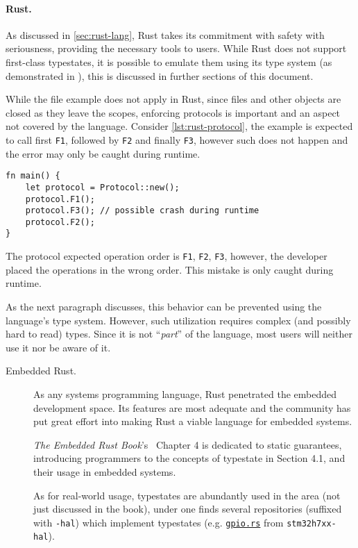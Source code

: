 \paragraph{Rust.}
As discussed in \autoref{sec:rust-lang}, Rust takes its commitment with safety with seriousness,
providing the necessary tools to users.
While Rust does not support first-class typestates,
it is possible to emulate them using its type system (as demonstrated in \autocite{Duarte2020}),
this is discussed in further sections of this document.

While the file example does not apply in Rust, since files and other objects are closed as they leave the scopes,
enforcing protocols is important and an aspect not covered by the language.
Consider \autoref{lst:rust-protocol}, the example is expected to call first \texttt{F1}, followed by \texttt{F2} and finally \texttt{F3},
however such does not happen and the error may only be caught during runtime.

\begin{listing}
    \centering
    \begin{verbatim}
fn main() {
    let protocol = Protocol::new();
    protocol.F1();
    protocol.F3(); // possible crash during runtime
    protocol.F2();
}
    \end{verbatim}
    \caption{
        The protocol expected operation order is \texttt{F1}, \texttt{F2}, \texttt{F3},
        however, the developer placed the operations in the wrong order.
        This mistake is only caught during runtime.
    }
    \label{lst:rust-protocol}
\end{listing}

As the next paragraph discusses, this behavior can be prevented using the language's type system.
However, such utilization requires complex (and possibly hard to read) types.
Since it is not “\emph{part}” of the language, most users will neither use it nor be aware of it.

\begin{description}
    \item[Embedded Rust.] As any systems programming language, Rust penetrated the embedded development space.
          Its features are most adequate and the community has put great effort into making Rust a viable language for embedded systems.

          \emph{The Embedded Rust Book}'s~\autocite{Rust2021} Chapter 4 is dedicated to static guarantees,
          introducing programmers to the concepts of typestate in Section 4.1, and their usage in embedded systems.

          As for real-world usage, typestates are abundantly used in the area (not just discussed in the book),
          under \autocite{Stm32} one finds several repositories (suffixed with \texttt{-hal})
          which implement typestates
          (e.g. \href{https://github.com/stm32-rs/stm32h7xx-hal/blob/master/src/gpio.rs#L51-L128}{\texttt{gpio.rs}}
          from \texttt{stm32h7xx-hal}).
\end{description}

